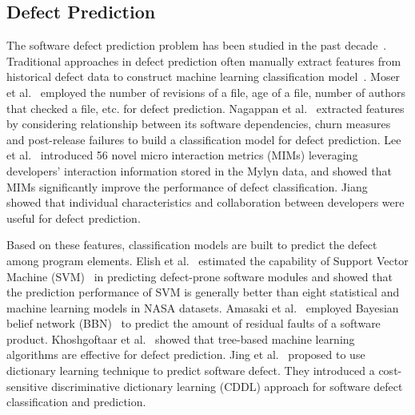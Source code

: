 \subsection{Defect Prediction}
\label{sec:defect}


The software defect prediction problem has been studied in the past decade~\cite{nam2013transfer, menzies2010defect, menzies2007data, zimmermann2007predicting, jiang2013personalized, nagappan2007using, nguyen2011topic, wang2012compressed}. Traditional approaches in defect prediction often manually extract features from historical defect data to construct machine learning classification model~\cite{menzies2010defect}. 
Moser et al.~\cite{moser2008comparative} employed the number of revisions of a file, age of a file, number of authors that checked a file, etc. for defect prediction. Nagappan et al.~\cite{nagappan2007using} extracted features by considering relationship between its software
dependencies, churn measures and post-release failures to build a classification model for defect prediction. Lee et al.~\cite{lee2011micro} introduced 56 novel micro interaction metrics (MIMs) leveraging developers' interaction information stored in the Mylyn data, and showed that MIMs significantly improve the performance of defect classification. Jiang~\cite{jiang2013personalized} showed that individual characteristics and collaboration between developers were useful for defect prediction. 

Based on these features, classification models are built to predict the defect among program elements. Elish et al.~\cite{elish2008predicting} estimated the capability of Support Vector Machine (SVM)~\cite{suykens1999least} in predicting defect-prone software modules and showed that the prediction performance of SVM is generally better than eight statistical and machine learning models in NASA datasets. Amasaki et al.~\cite{amasaki2003bayesian} employed Bayesian belief network (BBN)~\cite{mcabeebayesian} to predict the amount of residual faults of a software product. Khoshgoftaar et al.~\cite{khoshgoftaar2002tree}
showed that tree-based machine learning algorithms are effective for defect prediction. Jing et al.~\cite{jing2014dictionary} proposed to use dictionary learning technique to predict software defect. They introduced a cost-sensitive discriminative dictionary learning (CDDL) approach for software defect classification and prediction.

